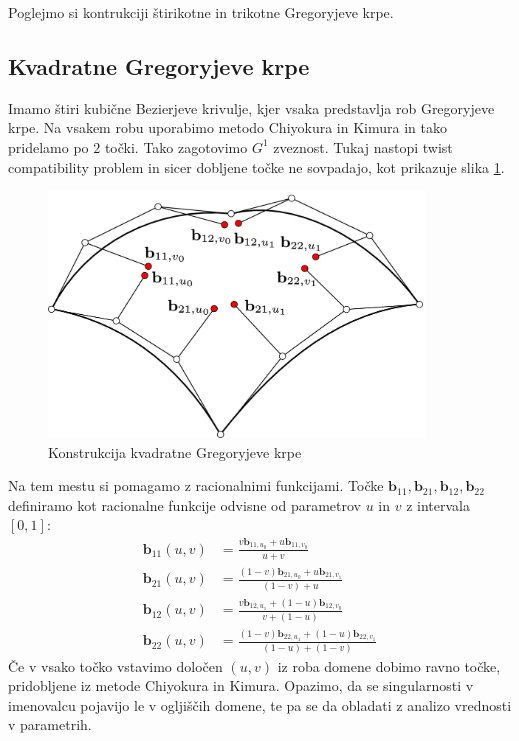 \documentclass[a4paper,regno]{article}
\newcommand{\tbf}{\textbf}
\begin{document}
Poglejmo si kontrukciji štirikotne in trikotne Gregoryjeve krpe.


\subsection{Kvadratne Gregoryjeve krpe}
Imamo štiri kubične Bezierjeve krivulje, kjer vsaka predstavlja rob Gregoryjeve krpe. Na vsakem robu uporabimo metodo Chiyokura in Kimura in tako pridelamo po $2$ točki. Tako zagotovimo $G^1$ zveznost. Tukaj nastopi twist compatibility problem in sicer dobljene točke ne sovpadajo, kot prikazuje slika \ref{fig:kvadratna}.

\begin{figure}[h]
	\centering
	\includegraphics[width=10cm]{gregory_krpe_kvadratna.jpg}
	\caption{Konstrukcija kvadratne Gregoryjeve krpe}
	\label{fig:kvadratna}
\end{figure}

Na tem mestu si pomagamo z racionalnimi funkcijami. Točke $\tbf{b}_{11}, \tbf{b}_{21}, \tbf{b}_{12}, \tbf{b}_{22}$ definiramo kot racionalne funkcije odvisne od parametrov $u$ in $v$ z intervala $[0,1]$:
\begin{align*}
\tbf{b}_{11}(u,v) &=  \frac{v \textbf{b}_{11,u_0}+u\tbf{b}_{11,v_0}}{u +v} \\
\tbf{b}_{21}(u,v) &= \frac{(1-v) \tbf{b}_{21,u_0}+u\tbf{b}_{21,v_1}}{(1-v)+u} \\
\tbf{b}_{12}(u,v) &= \frac{v \tbf{b}_{12,u_1}+(1-u)\tbf{b}_{12,v_0}}{v+(1-u)} \\
\tbf{b}_{22}(u,v) &= \frac{(1-v) \tbf{b}_{22,u_1}+(1-u)\tbf{b}_{22,v_1}}{(1-u)+(1-v)} 
\end{align*}
Če v vsako točko vstavimo določen $(u,v)$ iz roba domene dobimo ravno točke, pridobljene iz metode Chiyokura in Kimura. Opazimo, da se singularnosti v imenovalcu pojavijo le v ogljiščih domene, te pa se da obladati z analizo vrednosti v parametrih.
	
\end{document}
